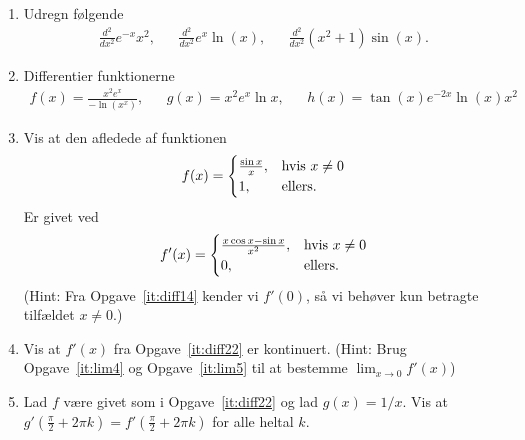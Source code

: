 \begin{enumerate}
	\item Udregn følgende
	\begin{align*}
	\frac{d^2}{dx^2} e^{-x}x^2,&& \frac{d^2}{dx^2} e^x\ln(x),&& \frac{d^2}{dx^2} (x^2+1)\sin(x).
	\end{align*}
	
	
	
	
	
	\item Differentier funktionerne
	\begin{align*}
	f(x)=\frac{x^2e^x}{-\ln(x^{x})},&& g(x)=x^2e^x\ln x,&& h(x)=\tan(x)e^{-2x}\ln(x)x^2
	\end{align*}
	
	
	
	
	\item\label{it:diff22} Vis at den afledede af funktionen
	\begin{align*}
	f(x)=\begin{cases}
	\frac{\sin x}{x},&\textup{hvis }x\neq 0\\
	1,&\textup{ellers}. 
	\end{cases}
	\end{align*}
	Er givet ved
	\begin{align*}
	f'(x)=\begin{cases}
	\frac{x\cos x-\sin x}{x^2},&\textup{hvis }x\neq 0\\
	0,&\textup{ellers}. 
	\end{cases}
	\end{align*}
	(Hint: Fra Opgave~\ref{it:diff14} kender vi $f'(0)$, så vi behøver kun betragte tilfældet $ x\neq 0 $.)
	
	\item Vis at $f'(x)$ fra Opgave~\ref{it:diff22} er kontinuert. (Hint: Brug Opgave~\ref{it:lim4} og Opgave~\ref{it:lim5} til at bestemme $ \lim_{x\to 0}f'(x) $)
	

	\item Lad $f$ være givet som i Opgave~\ref{it:diff22} og lad $g(x)=1/x$. Vis at $g'(\frac{\pi}{2}+2\pi k)=f'(\frac{\pi}{2}+2\pi k)$ for alle heltal $k$.
	
\end{enumerate}
